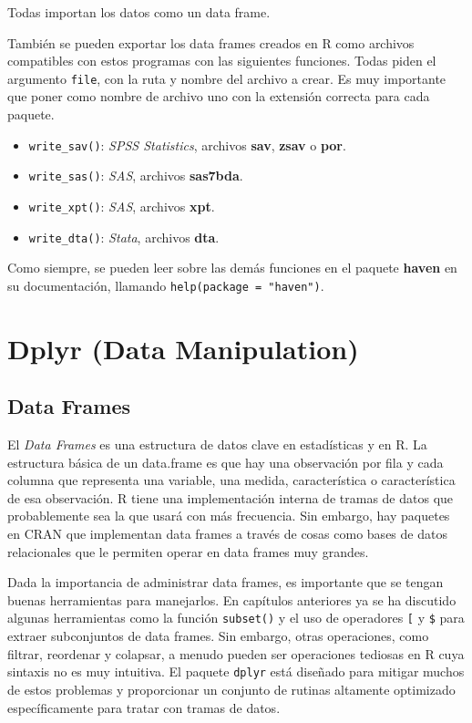 \documentclass[
]{book}
\providecommand{\tightlist}{%
  \setlength{\itemsep}{0pt}\setlength{\parskip}{0pt}}
\begin{document}
Todas importan los datos como un data frame.

También se pueden exportar los data frames creados en R como archivos compatibles con estos programas con las siguientes funciones. Todas piden el argumento \texttt{file}, con la ruta y nombre del archivo a crear. Es muy importante que poner como nombre de archivo uno con la extensión correcta para cada paquete.

\begin{itemize}
\tightlist
\item
  \texttt{write\_sav()}: \emph{SPSS Statistics}, archivos \textbf{sav}, \textbf{zsav} o \textbf{por}.
\item
  \texttt{write\_sas()}: \emph{SAS}, archivos \textbf{sas7bda}.
\item
  \texttt{write\_xpt()}: \emph{SAS}, archivos \textbf{xpt}.
\item
  \texttt{write\_dta()}: \emph{Stata}, archivos \textbf{dta}.
\end{itemize}

Como siempre, se pueden leer sobre las demás funciones en el paquete \textbf{haven} en su documentación, llamando \texttt{help(package\ =\ "haven")}.

\hypertarget{dplyr-data-manipulation}{%
\chapter{Dplyr (Data Manipulation)}\label{dplyr-data-manipulation}}

\hypertarget{data-frames-1}{%
\section{Data Frames}\label{data-frames-1}}

El \emph{Data Frames} es una estructura de datos clave en estadísticas y en R. La estructura básica de un data.frame es que hay una observación por fila y cada columna que representa una variable, una medida, característica o característica de esa observación. R tiene una implementación interna de tramas de datos que probablemente sea la que usará con más frecuencia. Sin embargo, hay paquetes en CRAN que implementan data frames a través de cosas como bases de datos relacionales que le permiten operar en data frames muy grandes.

Dada la importancia de administrar data frames, es importante que se tengan buenas herramientas para manejarlos. En capítulos anteriores ya se ha discutido algunas herramientas como la función \texttt{subset()} y el uso de operadores \texttt{{[}} y \texttt{\$} para extraer subconjuntos de data frames. Sin embargo, otras operaciones, como filtrar, reordenar y colapsar, a menudo pueden ser operaciones tediosas en R cuya sintaxis no es muy intuitiva. El paquete \texttt{dplyr} está diseñado para mitigar muchos de estos problemas y proporcionar un conjunto de rutinas altamente optimizado específicamente para tratar con tramas de datos.
\end{document}
